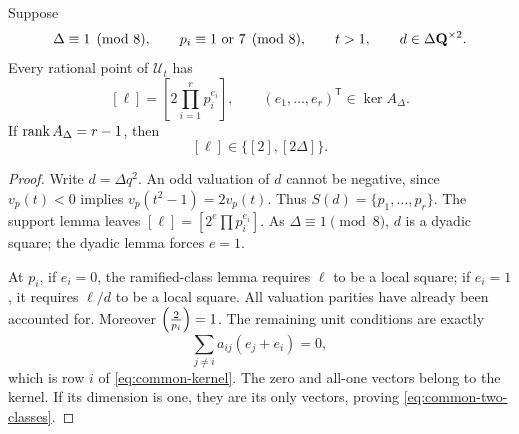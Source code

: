 \begin{proposition}\label{prop:common-matrix}
Suppose
\begin{equation}\label{eq:common-delta-hyp}
 \Delta\equiv1\pmod8,\qquad p_i\equiv1\text{ or }7\pmod8,
 \qquad t>1,\qquad d\in\Delta\mathbf Q^{\times2}.
\end{equation}
Every rational point of $\mathcal U_t$ has
\begin{equation}\label{eq:common-kernel}
 [\ell]=\left[2\prod_{i=1}^r p_i^{e_i}\right],
 \qquad (e_1,\ldots,e_r)^\mathsf T\in\ker A_\Delta.
\end{equation}
If $\operatorname{rank} A_\Delta=r-1$, then
\begin{equation}\label{eq:common-two-classes}
 [\ell]\in\{[2],[2\Delta]\}.
\end{equation}
\end{proposition}
\begin{proof}
Write $d=\Delta q^2$.  An odd valuation of $d$ cannot be negative,
since $v_p(t)<0$ implies $v_p(t^2-1)=2v_p(t)$.
Thus $S(d)=\{p_1,\ldots,p_r\}$.
The support lemma leaves $[\ell]=[2^e\prod p_i^{e_i}]$.
As $\Delta\equiv1\pmod8$, $d$ is a dyadic square; the dyadic lemma
forces $e=1$.

At $p_i$, if $e_i=0$, the ramified-class lemma requires $\ell$ to be a
local square; if $e_i=1$, it requires $\ell/d$ to be a local square.
All valuation parities have already been accounted for.
Moreover $\left(\frac{2}{p_i}\right)=1$.  The remaining unit conditions are exactly
\[
 \sum_{j\ne i}a_{ij}(e_j+e_i)=0,
\]
which is row $i$ of \eqref{eq:common-kernel}.
The zero and all-one vectors belong to the kernel.  If its dimension
is one, they are its only vectors, proving \eqref{eq:common-two-classes}.
\end{proof}

